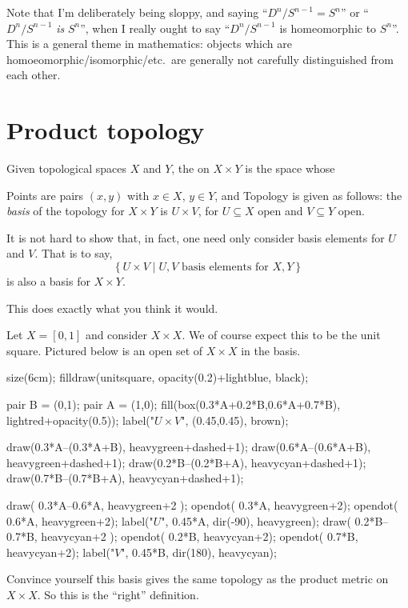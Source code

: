\begin{abuse}
	Note that I'm deliberately being sloppy, and saying
	``$D^n / S^{n-1} = S^n$'' or ``$D^n / S^{n-1}$ \emph{is} $S^n$'',
	when I really ought to say ``$D^n / S^{n-1}$ is homeomorphic to $S^n$''.
	This is a general theme in mathematics:
	objects which are homoeomorphic/isomorphic/etc.\ are generally
	not carefully distinguished from each other.
\end{abuse}

\section{Product topology}

\begin{definition}
	Given topological spaces $X$ and $Y$,
	the  on $X \times Y$ is the space whose
	\begin{itemize}
		\ii Points are pairs $(x,y)$ with $x \in X$, $y \in Y$, and
		\ii Topology is given as follows: the \emph{basis} of
		the topology for $X \times Y$ is $U \times V$,
		for $U \subseteq X$ open and $V \subseteq Y$ open.
	\end{itemize}
\end{definition}
\begin{remark}
	It is not hard to show that, in fact,
	one need only consider basis elements for $U$ and $V$.
	That is to say,
	\[ \left\{ U \times V \mid
		U,V \text{ basis elements for } X,Y \right\} \]
	is also a basis for $X \times Y$.
\end{remark}

This does exactly what you think it would.
\begin{example}
	Let $X = [0,1]$ and consider $X \times X$.
	We of course expect this to be the unit square.
	Pictured below is an open set of $X \times X$ in the basis.
	\begin{center}
		\begin{asy}
		size(6cm);
		filldraw(unitsquare, opacity(0.2)+lightblue, black);

		pair B = (0,1);
		pair A = (1,0);
		fill(box(0.3*A+0.2*B,0.6*A+0.7*B), lightred+opacity(0.5));
		label("$U \times V$", (0.45,0.45), brown);

		draw(0.3*A--(0.3*A+B), heavygreen+dashed+1);
		draw(0.6*A--(0.6*A+B), heavygreen+dashed+1);
		draw(0.2*B--(0.2*B+A), heavycyan+dashed+1);
		draw(0.7*B--(0.7*B+A), heavycyan+dashed+1);

		draw( 0.3*A--0.6*A, heavygreen+2 );
		opendot( 0.3*A,  heavygreen+2);
		opendot( 0.6*A, heavygreen+2);
		label("$U$", 0.45*A, dir(-90), heavygreen);
		draw( 0.2*B--0.7*B, heavycyan+2 );
		opendot( 0.2*B, heavycyan+2);
		opendot( 0.7*B, heavycyan+2);
		label("$V$", 0.45*B, dir(180), heavycyan);
		\end{asy}
	\end{center}
\end{example}
\begin{exercise}
	Convince yourself this basis gives the same topology
	as the product metric on $X \times X$.
	So this is the ``right'' definition.
\end{exercise}

